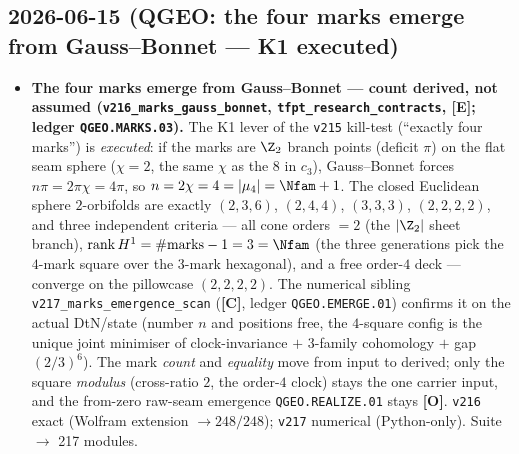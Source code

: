 \documentclass[11pt]{article}
\providecommand{\mE}{\textbf{[E]}}\providecommand{\mC}{\textbf{[C]}}
\providecommand{\mO}{\textbf{[O]}}\providecommand{\mX}{\textbf{[X]}}
\begin{document}
\subsection*{2026-06-15 (QGEO: the four marks emerge from Gauss--Bonnet --- K1 executed)}
\begin{itemize}
\item \textbf{The four marks emerge from Gauss--Bonnet --- count derived, not assumed
  (\texttt{v216\_marks\_gauss\_bonnet}, \texttt{tfpt\_research\_contracts}, \mE; ledger \texttt{QGEO.MARKS.03}).}
  The K1 lever of the \texttt{v215} kill-test (``exactly four marks'') is
  \emph{executed}: if the marks are $\Z_2$ branch points (deficit $\pi$) on the flat seam sphere ($\chi=2$,
  the same $\chi$ as the $8$ in $c_3$), Gauss--Bonnet forces $n\pi=2\pi\chi=4\pi$, so
  $n=2\chi=4=|\mu_4|=\Nfam+1$. The closed Euclidean sphere $2$-orbifolds are exactly
  $(2,3,6)$, $(2,4,4)$, $(3,3,3)$, $(2,2,2,2)$, and three independent criteria --- all cone orders $=2$ (the $|\Z_2|$
  sheet branch), $\mathrm{rank}\,H^1=\#\text{marks}-1=3=\Nfam$ (the three generations pick the $4$-mark square
  over the $3$-mark hexagonal), and a free order-$4$ deck --- converge on the pillowcase $(2,2,2,2)$. The
  numerical sibling \texttt{v217\_marks\_emergence\_scan} (\mC, ledger \texttt{QGEO.EMERGE.01}) confirms it on
  the actual DtN/state (number $n$ and positions free, the $4$-square config is the unique joint minimiser of
  clock-invariance $+$ $3$-family cohomology $+$ gap $(2/3)^6$). The mark \emph{count} and \emph{equality}
  move from input to derived; only the square
  \emph{modulus} (cross-ratio $2$, the order-$4$ clock) stays the one carrier input, and the from-zero
  raw-seam emergence \texttt{QGEO.REALIZE.01} stays \mO. \texttt{v216} exact (Wolfram extension
  $\to248/248$); \texttt{v217} numerical (Python-only). Suite $\to$ 217 modules.
\end{itemize}
\end{document}
